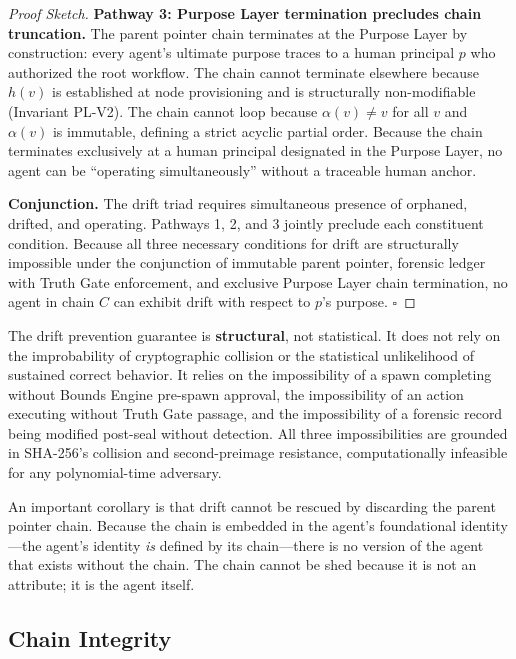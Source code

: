 \begin{proof}[Proof Sketch]
\medskip
\noindent\textbf{Pathway 3: Purpose Layer termination precludes chain truncation.}
The parent pointer chain terminates at the Purpose Layer by construction: every agent's ultimate purpose traces to a human principal $p$ who authorized the root workflow. The chain cannot terminate elsewhere because $h(v)$ is established at node provisioning and is structurally non-modifiable (Invariant PL-V2). The chain cannot loop because $\alpha(v) \neq v$ for all $v$ and $\alpha(v)$ is immutable, defining a strict acyclic partial order. Because the chain terminates exclusively at a human principal designated in the Purpose Layer, no agent can be ``operating simultaneously'' without a traceable human anchor.

\medskip
\noindent\textbf{Conjunction.}
The drift triad requires simultaneous presence of orphaned, drifted, and operating. Pathways 1, 2, and 3 jointly preclude each constituent condition. Because all three necessary conditions for drift are structurally impossible under the conjunction of immutable parent pointer, forensic ledger with Truth Gate enforcement, and exclusive Purpose Layer chain termination, no agent in chain $C$ can exhibit drift with respect to $p$'s purpose. $\square$
\end{proof}

The drift prevention guarantee is \textbf{structural}, not statistical. It does not rely on the improbability of cryptographic collision or the statistical unlikelihood of sustained correct behavior. It relies on the impossibility of a spawn completing without Bounds Engine pre-spawn approval, the impossibility of an action executing without Truth Gate passage, and the impossibility of a forensic record being modified post-seal without detection. All three impossibilities are grounded in SHA-256's collision and second-preimage resistance, computationally infeasible for any polynomial-time adversary.

An important corollary is that drift cannot be rescued by discarding the parent pointer chain. Because the chain is embedded in the agent's foundational identity---the agent's identity \emph{is} defined by its chain---there is no version of the agent that exists without the chain. The chain cannot be shed because it is not an attribute; it is the agent itself.

\subsection{Chain Integrity}

